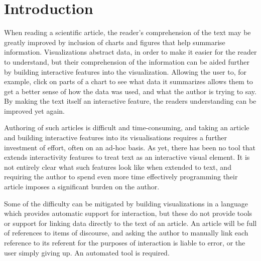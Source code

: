 \section{Introduction}

When reading a scientific article, the reader's comprehension of the text may
be greatly improved by inclusion of charts and figures that help summarise information.
Visualizations abstract data, in order to make it easier for the reader to understand,
but their comprehension of the information can be aided further by building interactive
features into the visualization. Allowing the user to, for example, click on parts
of a chart to see what data it summarizes allows them to get a better sense of
how the data was used, and what the author is trying to say. By making the text
itself an interactive feature, the readers understanding can be improved yet again.

Authoring of such articles is difficult and time-consuming, and taking an article
and building interactive features into its visualisations requires a further investment
of effort, often on an ad-hoc basis. As yet, there has been no tool that extends
interactivity features to treat text as an interactive visual element. It is not
entirely clear what such features look like when extended to text, and requiring
the author to spend even more time effectively programming their article imposes
a significant burden on the author. 

Some of the difficulty can be mitigated by building visualizations in a language
which provides automatic support for interaction, but these do not provide tools
or support for linking data directly to the text of an article. An article will
be full of references to items of discourse, and asking the author to manually
link each reference to its referent for the purposes of interaction is liable to
error, or the user simply giving up. An automated tool is required. 